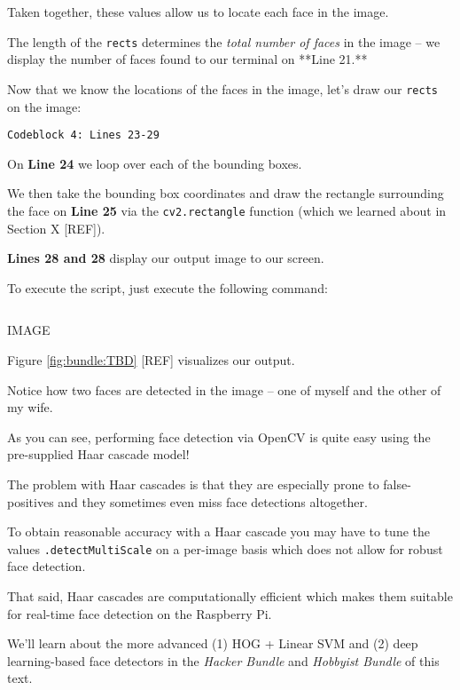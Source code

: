 \begin{itemize}
Taken together, these values allow us to locate each face in the image.

The length of the \texttt{rects} determines the \textit{total number of faces} in the image -- we display the number of faces found to our terminal on **Line 21.**

Now that we know the locations of the faces in the image, let’s draw our \texttt{rects} on the image:

\begin{verbatim}
Codeblock 4: Lines 23-29
\end{verbatim}

On \textbf{Line 24} we loop over each of the bounding boxes.

We then take the bounding box coordinates and draw the rectangle surrounding the face on \textbf{Line 25} via the \texttt{cv2.rectangle} function (which we learned about in Section X [REF]).

\textbf{Lines 28 and 28} display our output image to our screen.

To execute the script, just execute the following command:

\begin{verbatim}

\end{verbatim}

IMAGE

Figure \ref{fig:bundle:TBD} [REF] visualizes our output.

Notice how two faces are detected in the image -- one of myself and the other of my wife.

As you can see, performing face detection via OpenCV is quite easy using the pre-supplied Haar cascade model!

The problem with Haar cascades is that they are especially prone to false-positives and they sometimes even miss face detections altogether.

To obtain reasonable accuracy with a Haar cascade you may have to tune the values \texttt{.detectMultiScale} on a per-image basis which does not allow for robust face detection.

That said, Haar cascades are computationally efficient which makes them suitable for real-time face detection on the Raspberry Pi.

We’ll learn about the more advanced (1) HOG + Linear SVM and (2) deep learning-based face detectors in the \textit{Hacker Bundle} and \textit{Hobbyist Bundle} of this text.


\end{itemize}
